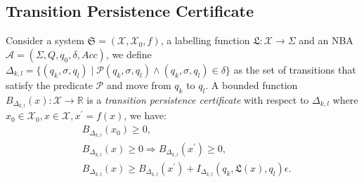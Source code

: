 \subsection{Transition Persistence Certificate}
\begin{definition}
  \label{bsbstct}
  Consider a system $\mathfrak{S} = (\mathcal{X}, \mathcal{X}_0, f)$, a labelling function $\mathfrak{L}:\mathcal{X} \rightarrow \Sigma$ and an NBA $\mathcal{A}=(\Sigma, Q, q_0, \delta, Acc)$, we define $\Delta_{k, l} = \{(q_k, \sigma, q_l) \mid \mathcal{P}(q_k, \sigma, q_l) \land (q_k, \sigma, q_l) \in \delta\}$
  as the set of transitions that satisfy the predicate $\mathcal{P}$ and move from $q_k$ to $q_l$.
  A bounded function $B_{\Delta_{k, l}}(x): \mathcal{X} \rightarrow \mathbb{R}$ is a \emph{transition persistence certificate} with
  respect to $\Delta_{k,l}$ where $x_0 \in \mathcal{X}_0, x \in \mathcal{X}, x^{\prime} = f(x)$, we have:
  \begin{align}
    &B_{\Delta_{k, l}}(x_0) \geq 0, \label{bstnn} \\
    &B_{\Delta_{k, l}}(x) \geq 0 \Rightarrow B_{\Delta_{k, l}}(x^{\prime}) \geq 0, \label{bsttnn} \\
    &B_{\Delta_{k, l}}(x) \geq B_{\Delta_{k, l}}(x^{\prime}) + I_{\Delta_{k,l}}(q_k, \mathfrak{L}(x), q_l)\epsilon. \label{bstni}
  \end{align}
\end{definition}

